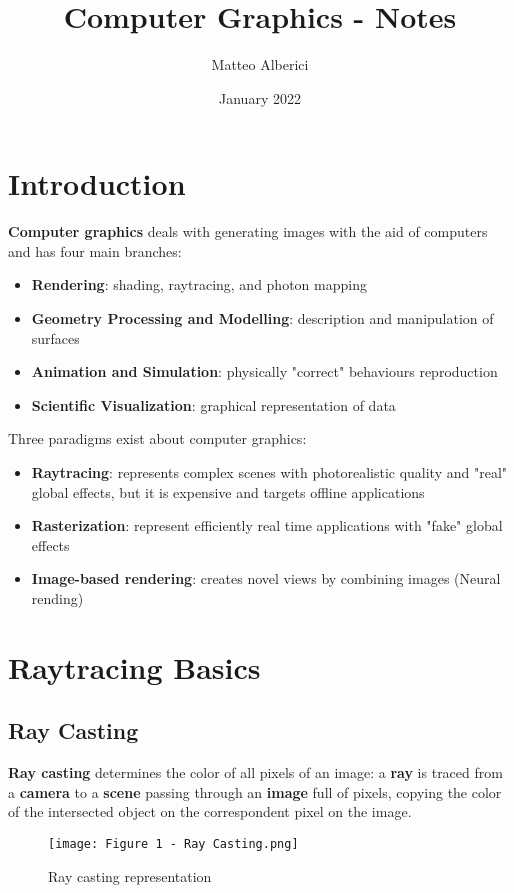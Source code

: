 \documentclass{article}
\title{Computer Graphics - Notes}
\author{Matteo Alberici}
\date{January 2022}
\begin{document}
\maketitle
\newpage
\newpage
\tableofcontents
\newpage

\section{Introduction}
\textbf{Computer graphics} deals with generating images with the aid of computers and has four main branches: 
\begin{itemize}
    \item \textbf{Rendering}: shading, raytracing, and photon mapping
    \item \textbf{Geometry Processing and Modelling}: description and manipulation of surfaces
    \item \textbf{Animation and Simulation}: physically "correct" behaviours reproduction
    \item \textbf{Scientific Visualization}: graphical representation of data
\end{itemize}
Three paradigms exist about computer graphics:
\begin{itemize}
    \item \textbf{Raytracing}: represents complex scenes with photorealistic quality and "real" global effects, but it is expensive and targets offline applications
    \item \textbf{Rasterization}: represent efficiently real time applications with "fake" global effects
    \item \textbf{Image-based rendering}: creates novel views by combining images (Neural rending)
\end{itemize}

\newpage

\section{Raytracing Basics}
\subsection{Ray Casting}
\textbf{Ray casting} determines the color of all pixels of an image: a \textbf{ray} is traced from a \textbf{camera} to a \textbf{scene} passing through an \textbf{image} full of pixels, copying the color of the intersected object on the correspondent pixel on the image.
\begin{figure}[H]
    \centering
    \texttt{[image: Figure 1 - Ray Casting.png]}
    \caption{Ray casting representation}
\end{figure}
\end{document}
